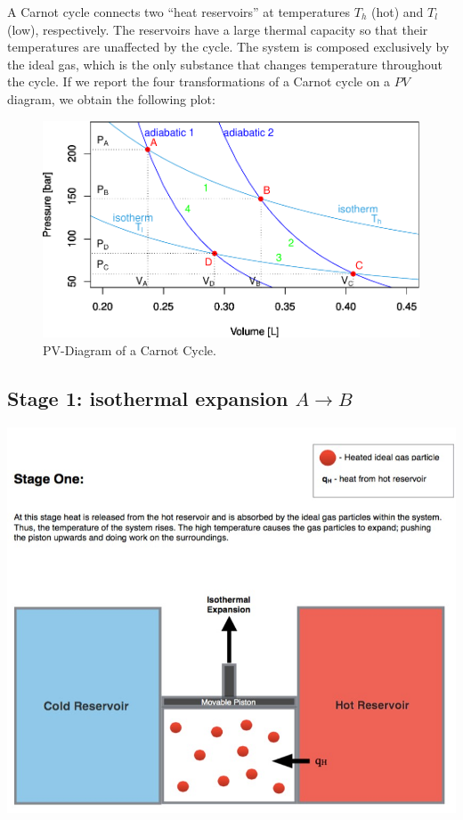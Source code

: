 \documentclass[
  9pt,
]{extbook}
\theoremstyle{definition}
\theoremstyle{definition}
\theoremstyle{definition}
\theoremstyle{remark}
\begin{document}
A Carnot cycle connects two ``heat reservoirs'' at temperatures \(T_h\) (hot) and \(T_l\) (low), respectively. The reservoirs have a large thermal capacity so that their temperatures are unaffected by the cycle. The system is composed exclusively by the ideal gas, which is the only substance that changes temperature throughout the cycle. If we report the four transformations of a Carnot cycle on a \(PV\) diagram, we obtain the following plot:

\begin{figure}

{\centering \includegraphics[width=0.7\linewidth]{pchem1_files/figure-latex/FigCarnotPV-1} 

}

\caption{PV-Diagram of a Carnot Cycle.}\label{fig:FigCarnotPV}
\end{figure}

\hypertarget{CCstage1}{%
\subsection{\texorpdfstring{Stage 1: isothermal expansion \(A \rightarrow B\)}{Stage 1: isothermal expansion A \textbackslash rightarrow B}}\label{CCstage1}}

\begin{center}\includegraphics[width=0.7\linewidth]{./img/OEP_Figures.007a} \end{center}
\end{document}
